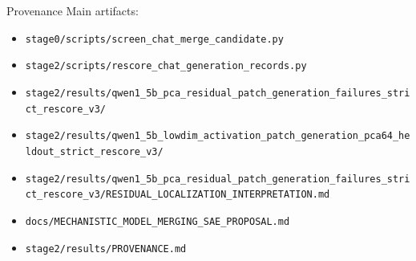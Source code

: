 \documentclass[aspectratio=169]{beamer}
\begin{document}
\begin{frame}{Provenance}
  \small
  Main artifacts:
  \begin{itemize}
    \item \texttt{stage0/scripts/screen\_chat\_merge\_candidate.py}
    \item \texttt{stage2/scripts/rescore\_chat\_generation\_records.py}
    \item \texttt{stage2/results/qwen1\_5b\_pca\_residual\_patch\_generation\_failures\_strict\_rescore\_v3/}
    \item \texttt{stage2/results/qwen1\_5b\_lowdim\_activation\_patch\_generation\_pca64\_heldout\_strict\_rescore\_v3/}
    \item \texttt{stage2/results/qwen1\_5b\_pca\_residual\_patch\_generation\_failures\_strict\_rescore\_v3/RESIDUAL\_LOCALIZATION\_INTERPRETATION.md}
    \item \texttt{docs/MECHANISTIC\_MODEL\_MERGING\_SAE\_PROPOSAL.md}
    \item \texttt{stage2/results/PROVENANCE.md}
  \end{itemize}
\end{frame}
\end{document}
